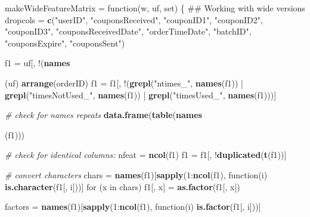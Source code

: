 \documentclass[10pt]{report}
\newenvironment{Shaded}{}{}
\newcommand{\KeywordTok}[1]{\textcolor[rgb]{0.00,0.44,0.13}{\textbf{{#1}}}}
\newcommand{\DataTypeTok}[1]{\textcolor[rgb]{0.56,0.13,0.00}{{#1}}}
\newcommand{\DecValTok}[1]{\textcolor[rgb]{0.25,0.63,0.44}{{#1}}}
\newcommand{\StringTok}[1]{\textcolor[rgb]{0.25,0.44,0.63}{{#1}}}
\newcommand{\CommentTok}[1]{\textcolor[rgb]{0.38,0.63,0.69}{\textit{{#1}}}}
\newcommand{\NormalTok}[1]{{#1}}
\begin{document}
\begin{Shaded}
\begin{Highlighting}[]
\NormalTok{makeWideFeatureMatrix =}\StringTok{ }\NormalTok{function(w, uf, set) \{}
    \NormalTok{## Working with wide versions}
    \NormalTok{dropcols =}\StringTok{ }\KeywordTok{c}\NormalTok{(}\StringTok{"userID"}\NormalTok{, }\StringTok{"couponsReceived"}\NormalTok{, }\StringTok{"couponID1"}\NormalTok{, }\StringTok{"couponID2"}\NormalTok{, }\StringTok{"couponID3"}\NormalTok{, }
        \StringTok{"couponsReceivedDate"}\NormalTok{, }\StringTok{"orderTimeDate"}\NormalTok{, }\StringTok{"batchID"}\NormalTok{, }\StringTok{"couponsExpire"}\NormalTok{, }
        \StringTok{"couponsSent"}\NormalTok{)}
    
    \NormalTok{f1 =}\StringTok{ }\NormalTok{uf[, !(}\KeywordTok{names}\NormalTok{(uf) %in%}\StringTok{ }\NormalTok{dropcols)] %>%}\StringTok{ }\KeywordTok{left_join}\NormalTok{(w, }\DataTypeTok{by =} \StringTok{"orderID"}\NormalTok{) %>%}\StringTok{ }
\StringTok{        }\KeywordTok{arrange}\NormalTok{(orderID)}
    \NormalTok{f1 =}\StringTok{ }\NormalTok{f1[, !(}\KeywordTok{grepl}\NormalTok{(}\StringTok{"ntimes_"}\NormalTok{, }\KeywordTok{names}\NormalTok{(f1)) |}\StringTok{ }\KeywordTok{grepl}\NormalTok{(}\StringTok{"timesNotUsed_"}\NormalTok{, }\KeywordTok{names}\NormalTok{(f1)) |}\StringTok{ }
\StringTok{        }\KeywordTok{grepl}\NormalTok{(}\StringTok{"timesUsed_"}\NormalTok{, }\KeywordTok{names}\NormalTok{(f1)))]}
    
    \CommentTok{# check for names repeats}
    \KeywordTok{data.frame}\NormalTok{(}\KeywordTok{table}\NormalTok{(}\KeywordTok{names}\NormalTok{(f1))) %>%}\StringTok{ }\KeywordTok{arrange}\NormalTok{(Freq) %>%}\StringTok{ }\NormalTok{head}
    
    \CommentTok{# check for identical columns:}
    \NormalTok{nfeat =}\StringTok{ }\KeywordTok{ncol}\NormalTok{(f1)}
    \NormalTok{f1 =}\StringTok{ }\NormalTok{f1[, !}\KeywordTok{duplicated}\NormalTok{(}\KeywordTok{t}\NormalTok{(f1))]}
    
    \CommentTok{# convert characters}
    \NormalTok{chars =}\StringTok{ }\KeywordTok{names}\NormalTok{(f1)[}\KeywordTok{sapply}\NormalTok{(}\DecValTok{1}\NormalTok{:}\KeywordTok{ncol}\NormalTok{(f1), function(i) }\KeywordTok{is.character}\NormalTok{(f1[, i]))]}
    \NormalTok{for (x in chars) f1[, x] =}\StringTok{ }\KeywordTok{as.factor}\NormalTok{(f1[, x])}
    
    \NormalTok{factors =}\StringTok{ }\KeywordTok{names}\NormalTok{(f1)[}\KeywordTok{sapply}\NormalTok{(}\DecValTok{1}\NormalTok{:}\KeywordTok{ncol}\NormalTok{(f1), function(i) }\KeywordTok{is.factor}\NormalTok{(f1[, i]))]}
    
}}
\end{Highlighting}
\end{Shaded}
\end{document}
